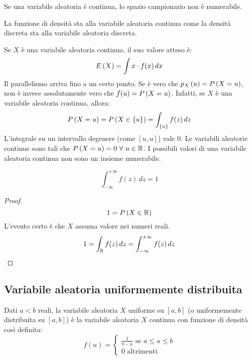 Se una variabile aleatoria \`e continua, lo spazio campionario non \`e numerabile.

La funzione di densit\`a sta alla variabile aleatoria continua come la densit\`a discreta sta alla variabile aleatoria discreta.

Se $X$ \`e una variabile aleatoria continua, il suo valore atteso \`e:
\[
E \left( X \right) = \int x \cdot f(x) \, dx
\]
Il parallelismo arriva fino a un certo punto. Se \`e vero che $p_{X} \left( u \right) = P \left( {X = u} \right)$, non \`e invece assolutamente vero che $f(u) = P \left( {X = u} \right)$. Infatti, se $X$ \`e una variabile aleatoria continua, allora:
\[
P \left( {X = u} \right) = P \left( {X \in \{u\}} \right) = \int_{\{u\}} f(z) \, dz
\]
L'integrale su un intervallo degenere (come $[u,u]$) vale 0. Le variabili aleatorie continue sono tali che $\prob{X = u} = 0 \forall u \in \reals$. I possibili valori di una variabile aleatoria continua non sono un insieme numerabile.

\begin{oss}
\[
\int_{-\infty}^{+\infty} f(z) \, dz = 1
\]
\end{oss}

\begin{proof}
\[
1 = P \left( {X \in \mathbb{R}} \right)
\]
L'evento certo \`e che $X$ assuma valore nei numeri reali.
\[
1 = \int_{\mathbb{R}} f(z) \, dz = \int_{-\infty}^{+\infty} f(z) \, dz
\]
\end{proof}

\subsection{Variabile aleatoria uniformemente distribuita}

\begin{defn}
Dati $a < b$ reali, la variabile aleatoria $X$ uniforme su $[a,b]$ (o uniformemente distribuita su $[a,b]$) \`e la variabile aleatoria $X$ continua con funzione di densit\`a cos\`i definita:
\[
f(u) =
\begin{cases}
\frac{1}{b - a} \text{ se } a \le u \le b \\
0 \text{ altrimenti}
\end{cases}
\]
\end{defn}

